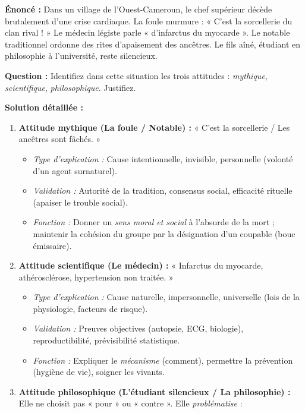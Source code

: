 \documentclass[11pt]{article}
\begin{document}
\begin{exoresolu}
\textbf{Énoncé :} Dans un village de l'Ouest-Cameroun, le chef supérieur décède brutalement d'une crise cardiaque. La foule murmure : « C'est la sorcellerie du clan rival ! » Le médecin légiste parle « d'infarctus du myocarde ». Le notable traditionnel ordonne des rites d'apaisement des ancêtres. Le fils aîné, étudiant en philosophie à l'université, reste silencieux.

\textbf{Question :} Identifiez dans cette situation les trois attitudes : \emph{mythique}, \emph{scientifique}, \emph{philosophique}. Justifiez.

\tcblower
\textbf{Solution détaillée :}

\begin{enumerate}
    \item \textbf{Attitude mythique (La foule / Notable) :} « C'est la sorcellerie / Les ancêtres sont fâchés. »
        \begin{itemize}
            \item \emph{Type d'explication :} Cause intentionnelle, invisible, personnelle (volonté d'un agent surnaturel).
            \item \emph{Validation :} Autorité de la tradition, consensus social, efficacité rituelle (apaiser le trouble social).
            \item \emph{Fonction :} Donner un \emph{sens moral et social} à l'absurde de la mort ; maintenir la cohésion du groupe par la désignation d'un coupable (bouc émissaire).
        \end{itemize}
    \item \textbf{Attitude scientifique (Le médecin) :} « Infarctus du myocarde, athérosclérose, hypertension non traitée. »
        \begin{itemize}
            \item \emph{Type d'explication :} Cause naturelle, impersonnelle, universelle (lois de la physiologie, facteurs de risque).
            \item \emph{Validation :} Preuves objectives (autopsie, ECG, biologie), reproductibilité, prévisibilité statistique.
            \item \emph{Fonction :} Expliquer le \emph{mécanisme} (comment), permettre la prévention (hygiène de vie), soigner les vivants.
        \end{itemize}
    \item \textbf{Attitude philosophique (L'étudiant silencieux / La philosophie) :} Elle ne choisit pas « pour » ou « contre ». Elle \emph{problématise} :

\end{enumerate}
\end{exoresolu}
\end{document}
